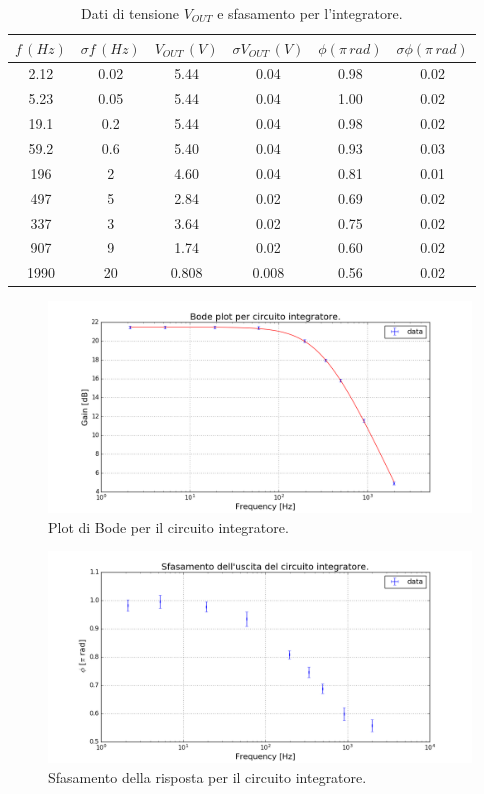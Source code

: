 \documentclass[10pt,a4paper]{article}
\begin{document}
\begin{table}[!htb]\centering
\begin{tabular}{|c|c|c|c|c|c|}
\hline$f \, (Hz)$ & $ \sigma f \, (Hz)$ & $V_{OUT} \, (V)$ & $\sigma V_{OUT} \, (V)$ & $\phi (\pi \, rad)$ & $\sigma \phi (\pi \,  rad)$\\
\hline
2.12 & 0.02 & 5.44 & 0.04 & 0.98 & 0.02\\
5.23 & 0.05 & 5.44 & 0.04 & 1.00 & 0.02\\
19.1 & 0.2 & 5.44 & 0.04 & 0.98 & 0.02\\
59.2 & 0.6 & 5.40 & 0.04 & 0.93 & 0.03\\
196 & 2 & 4.60 & 0.04 & 0.81 & 0.01\\
497 & 5 & 2.84 & 0.02 & 0.69 & 0.02\\
337 & 3 & 3.64 & 0.02 & 0.75 & 0.02\\
907 & 9 & 1.74 & 0.02 & 0.60 & 0.02\\
1990 & 20 & 0.808 & 0.008 & 0.56 & 0.02\\
\hline
\end{tabular}
\caption{Dati di tensione $V_{OUT}$ e sfasamento per l'integratore.}
\label{tabellaIntegratore}
\end{table}


\begin{figure}[!htb]
\centering
  \includegraphics[scale=0.6]{bodeIntegratore.png}
\caption{Plot di Bode per il circuito integratore.}
\label{plotIntegratore}
\end{figure}

\begin{figure}[!htb]
\centering
  \includegraphics[scale=0.6]{integratoreSfasamento.png}
\caption{Sfasamento della risposta per il circuito integratore.}
\label{plotIntegratore2}
\end{figure}
\end{document}
